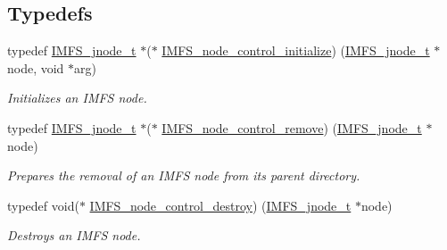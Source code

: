 \subsection*{Typedefs}
\begin{DoxyCompactItemize}
\item 
typedef \mbox{\hyperlink{structIMFS__jnode__tt}{I\+M\+F\+S\+\_\+jnode\+\_\+t}} $\ast$($\ast$ \mbox{\hyperlink{group__IMFSGenericNodes_gaa17eaae581fd5703b3bd1a3b5e95b054}{I\+M\+F\+S\+\_\+node\+\_\+control\+\_\+initialize}}) (\mbox{\hyperlink{structIMFS__jnode__tt}{I\+M\+F\+S\+\_\+jnode\+\_\+t}} $\ast$node, void $\ast$arg)
\begin{DoxyCompactList}\small\item\em Initializes an I\+M\+FS node. \end{DoxyCompactList}\item 
typedef \mbox{\hyperlink{structIMFS__jnode__tt}{I\+M\+F\+S\+\_\+jnode\+\_\+t}} $\ast$($\ast$ \mbox{\hyperlink{group__IMFSGenericNodes_gab8e5f3c5eb8c39d46a5cc865cf90125c}{I\+M\+F\+S\+\_\+node\+\_\+control\+\_\+remove}}) (\mbox{\hyperlink{structIMFS__jnode__tt}{I\+M\+F\+S\+\_\+jnode\+\_\+t}} $\ast$node)
\begin{DoxyCompactList}\small\item\em Prepares the removal of an I\+M\+FS node from its parent directory. \end{DoxyCompactList}\item 
typedef void($\ast$ \mbox{\hyperlink{group__IMFSGenericNodes_ga9b01d3df01e1e6c71cd242336fe2a793}{I\+M\+F\+S\+\_\+node\+\_\+control\+\_\+destroy}}) (\mbox{\hyperlink{structIMFS__jnode__tt}{I\+M\+F\+S\+\_\+jnode\+\_\+t}} $\ast$node)
\begin{DoxyCompactList}\small\item\em Destroys an I\+M\+FS node. \end{DoxyCompactList}\end{DoxyCompactItemize}
